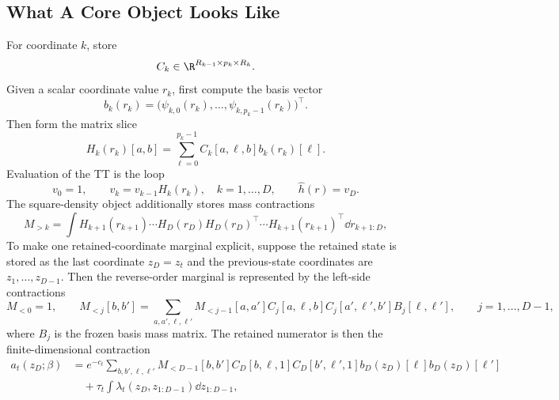 \subsection{What A Core Object Looks Like}
\label{sec:bf-hd-squared-tt-core-object}

For coordinate \(k\), store
\begin{equation}
  C_k\in\R^{R_{k-1}\times p_k\times R_k}.
  \label{eq:bf-hd-squared-tt-core-shape}
\end{equation}
Given a scalar coordinate value \(r_k\), first compute the basis vector
\begin{equation}
  b_k(r_k)=
  \bigl(\psi_{k,0}(r_k),\ldots,\psi_{k,p_k-1}(r_k)\bigr)^\top.
  \label{eq:bf-hd-squared-tt-basis-vector}
\end{equation}
Then form the matrix slice
\begin{equation}
  H_k(r_k)[a,b]
  =
  \sum_{\ell=0}^{p_k-1}C_k[a,\ell,b]b_k(r_k)[\ell].
  \label{eq:bf-hd-squared-tt-core-eval}
\end{equation}
Evaluation of the TT is the loop
\begin{equation}
  v_0=1,
  \qquad
  v_k=v_{k-1}H_k(r_k),\quad k=1,\ldots,D,
  \qquad
  \widehat h(r)=v_D.
  \label{eq:bf-hd-squared-tt-tt-eval}
\end{equation}
The square-density object additionally stores mass contractions
\begin{equation}
  M_{>k}
  =
  \int H_{k+1}(r_{k+1})\cdots H_D(r_D)
  H_D(r_D)^\top\cdots H_{k+1}(r_{k+1})^\top
  \dd r_{k+1:D},
  \label{eq:bf-hd-squared-tt-mass-contraction}
\end{equation}
To make one retained-coordinate marginal explicit, suppose the retained state is
stored as the last coordinate $z_D=z_t$ and the previous-state coordinates are
$z_1,\ldots,z_{D-1}$.  Then the reverse-order marginal is represented by the
left-side contractions
\begin{equation}
  M_{<0}=1,
  \qquad
  M_{<j}[b,b']
  =
  \sum_{a,a',\ell,\ell'}
  M_{<j-1}[a,a']
  C_j[a,\ell,b]
  C_j[a',\ell',b']
  B_j[\ell,\ell'],
  \qquad j=1,\ldots,D-1,
  \label{eq:bf-hd-squared-tt-left-mass-recursion}
\end{equation}
where $B_j$ is the frozen basis mass matrix.  The retained numerator is then the
finite-dimensional contraction
\begin{equation}
\begin{aligned}
  a_t(z_D;\beta)
  &=
  e^{-c_t}
  \sum_{b,b',\ell,\ell'}
  M_{<D-1}[b,b']
  C_D[b,\ell,1]
  C_D[b',\ell',1]
  b_D(z_D)[\ell]
  b_D(z_D)[\ell']\\
  &\quad+
  \tau_t
  \int \lambda_t(z_D,z_{1:D-1})\dd z_{1:D-1},
  \label{eq:bf-hd-squared-tt-retained-numerator-contraction}
\end{aligned}
\end{equation}
